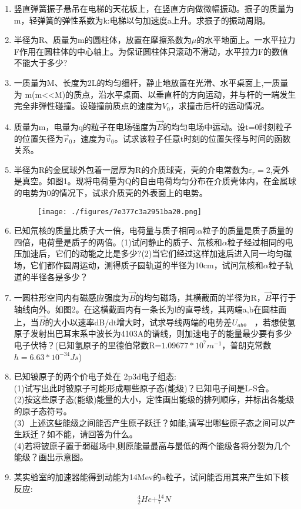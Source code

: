 
\begin{enumerate}
\item 竖直弹簧振子悬吊在电梯的天花板上，在竖直方向做微幅振动。振子的质量为m，轻弹簧的弹性系数为k:电梯以匀加速度a上升。求振子的振动周期。
\item 半径为R、质量为m的圆柱体，放置在摩擦系数为$\mu$的水平地面上。一水平拉力F作用在圆柱体的中心轴上。为保证圆柱体只滚动不滑动，水平拉力F的数值不能大于多少?
\item 一质量为M、长度为2L的均匀细杆，静止地放置在光滑、水平桌面上,一质量为 m(m<<M)的质点，沿水平桌面、以垂直杆的方向运动，并与杆的一端发生完全非弹性碰撞。设碰撞前质点的速度为$V_0$，求撞击后杆的运动情况。
\item 质量为m，电量为q的粒子在电场强度为$\vec E$的均匀电场中运动。设t=0时刻粒子的位置矢径为$\vec r_0$，速度为$\vec v_0$。试求该粒子任意t时刻的位置矢径与时间的函数关系。
\item 半径为R的金属球外包着一层厚为R的介质球壳，壳的介电常数为$\varepsilon_r=2$,壳外是真空。如图1。现将电荷量为Q的自由电荷均匀分布在介质壳体内，在金属球的电势为0的情况下，试求介质壳的外表面上的电势。
\begin{figure}[ht]
\centering
\texttt{[image: ./figures/7e377c3a2951ba20.png]}
\caption{} \label{fig_SSD04_1}
\end{figure}
\item 已知氘核的质量比质子大一倍，电荷量与质子相同:$\alpha$粒子的质量是质子质量的四倍，电荷量是质子的两倍。(1)试问静止的质子、氘核和$\alpha$粒子经过相同的电压加速后，它们的动能之比是多少?(2)当它们经过这样加速后进入同一均匀磁场，它们都作圆周运动，测得质子圆轨道的半径为10cm，试问氘核和$\alpha$粒子轨道的半径各是多少？
\item 一圆柱形空间内有磁感应强度为$\vec B$的均匀磁场，其横截面的半径为R，$\vec B$平行于轴线向外。如图2。在这横截面内有一条长为l的直导线，其两端a,b在圆柱面上，当$\vec B$的大小以速率dB/dt增大时，试求导线两端的电势差$U_{ab}$。
，若想使氢原子发射出巴耳末系中波长为4103A的谱线，则加速电子的能量最少要有多少电子伏特？(已知氢原子的里德伯常数R=$1.09677*10^7 m^{-1}$，普朗克常数$h=6.63*10^{-34}Js $)
\item 已知铍原子的两个价电子处在 2p3d电子组态:\\
(1)试写出此时铍原子可能形成哪些原子态(能级)？已知电子间是L-S合。\\
(2)按这些原子态(能级)能量的大小，定性画出能级的排列顺序，并标出各能级的原子态符号。\\
(3）上述这些能级之间能否产生原子跃迁？如能,请写出哪些原子态之间可以产生跃迁？如不能，请回答为什么。\\
(4)若将铍原子置于弱磁场中,则原能量最高与最低的两个能级各将分裂为几个能级？画出示意图。
\item 某实验室的加速器能得到动能为14Mev的a粒子，试问能否用其来产生如下核反应:\begin{equation}
^4_2He+^14_7N ~
\end{equation}
\end{enumerate}
